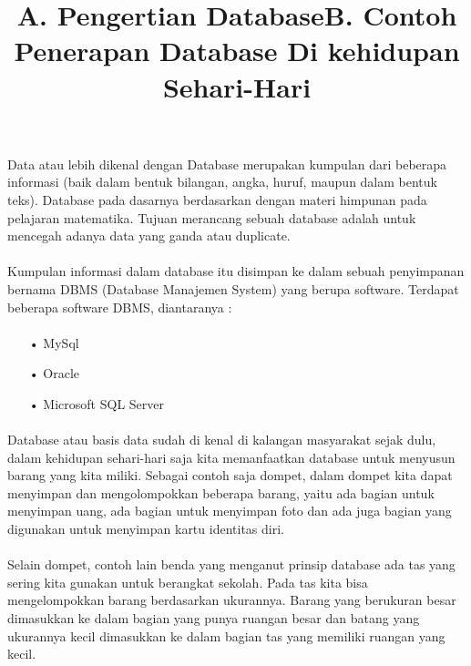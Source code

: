 \documentclass[a4paper, 12pt]{article}
\begin{document}
\begin{flushleft}
\title{\textbf{A. Pengertian Database}\linebreak}
\paragraph{}Data atau lebih dikenal dengan Database merupakan kumpulan dari beberapa informasi (baik dalam bentuk bilangan, angka, huruf, maupun dalam bentuk teks). Database pada dasarnya berdasarkan dengan materi himpunan pada pelajaran matematika. Tujuan merancang sebuah database adalah untuk mencegah adanya data yang ganda atau duplicate.
\paragraph{} Kumpulan informasi dalam database itu disimpan ke dalam sebuah penyimpanan bernama DBMS (Database Manajemen System) yang berupa software. Terdapat beberapa software DBMS, diantaranya :
\end{flushleft}
\begin{flushleft}
\paragraph{} 
\begin{itemize}
\item[•] MySql
\item[•] Oracle
\item[•] Microsoft SQL Server
\end{itemize}
\end{flushleft}
\newline
\begin{flushleft}
\title{\textbf{B. Contoh Penerapan Database Di kehidupan Sehari-Hari}\linebreak}
\paragraph{}Database atau basis data sudah di kenal di kalangan masyarakat sejak dulu, dalam kehidupan sehari-hari saja kita memanfaatkan database untuk menyusun barang yang kita miliki. Sebagai contoh saja dompet, dalam dompet kita dapat menyimpan dan mengolompokkan beberapa barang, yaitu ada bagian untuk menyimpan uang, ada bagian untuk menyimpan foto dan ada juga bagian yang digunakan untuk menyimpan kartu identitas diri.
\paragraph{}Selain dompet, contoh lain benda yang menganut prinsip database ada tas yang sering kita gunakan untuk berangkat sekolah. Pada tas kita bisa mengelompokkan barang berdasarkan ukurannya. Barang yang berukuran besar dimasukkan ke dalam bagian yang punya ruangan besar dan batang yang ukurannya kecil dimasukkan ke dalam bagian tas yang memiliki ruangan yang kecil.
\end{flushleft}
\newline
\end{document}
